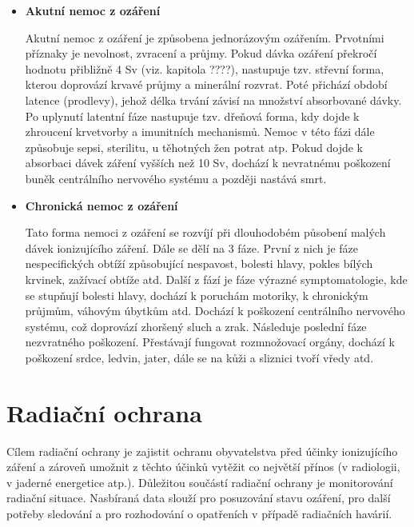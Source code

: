\begin{itemize}
	\item \textbf{Akutní nemoc z ozáření}
	
		Akutní nemoc z ozáření je způsobena jednorázovým ozářením. Prvotními příznaky je nevolnost, zvracení a průjmy. Pokud dávka ozáření překročí hodnotu přibližně 4 Sv (viz. kapitola ????), nastupuje tzv. střevní forma, kterou doprovází krvavé průjmy a minerální rozvrat. Poté přichází období latence (prodlevy), jehož délka trvání závisí na množství absorbované dávky. Po uplynutí latentní fáze nastupuje tzv. dřeňová forma, kdy dojde k zhroucení krvetvorby a imunitních mechanismů. Nemoc v této fázi dále způsobuje sepsi, sterilitu, u těhotných žen potrat atp. Pokud dojde k absorbaci dávek záření vyšších než 10 Sv, dochází k nevratnému poškození buněk centrálního nervového systému a později nastává smrt.
		
	\item \textbf{Chronická nemoc z ozáření}
	
		Tato forma nemoci z ozáření se rozvíjí při dlouhodobém působení malých dávek ionizujícího záření. Dále se dělí na 3 fáze. První z nich je fáze nespecifických obtíží způsobující nespavost, bolesti hlavy, pokles bílých krvinek, zažívací obtíže atd. Další z fází je fáze výrazné symptomatologie, kde se stupňují bolesti hlavy, dochází k poruchám motoriky, k chronickým průjmům, váhovým úbytkům atd. Dochází k poškození centrálního nervového systému, což doprovází zhoršený sluch a zrak. Následuje poslední fáze nezvratného poškození. Přestávají fungovat rozmnožovací orgány, dochází k poškození srdce, ledvin, jater, dále se na kůži a sliznici tvoří vředy atd. 
\end{itemize}

\section{Radiační ochrana} %
Cílem radiační ochrany je zajistit ochranu obyvatelstva před účinky ionizujícího záření a zároveň umožnit z těchto účinků vytěžit co největší přínos (v radiologii, v jaderné energetice atp.). Důležitou součástí radiační ochrany je monitorování radiační situace. Nasbíraná data slouží pro posuzování stavu ozáření, pro další potřeby sledování a pro rozhodování o opatřeních v případě radiačních havárií. %


